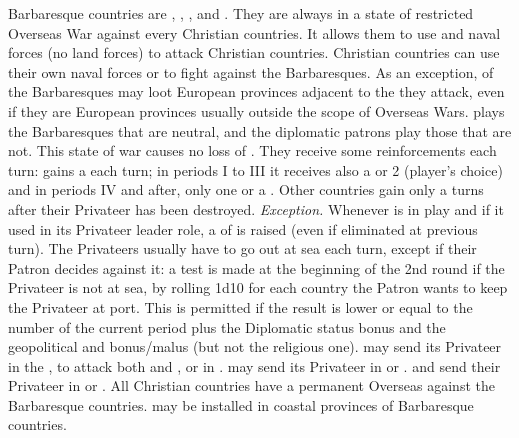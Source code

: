 \label{chSpecific:Barbaresques}
 Barbaresque countries are ,
, ,  and . They
are always in a state of restricted Overseas War against every Christian
countries.
\bparag It allows them to use \corsaire and naval forces (no land
forces) to attack Christian countries. Christian countries can use their
own naval forces or \Presidios to fight against the Barbaresques.
\bparag As an exception, \corsaire of the Barbaresques may loot European
provinces adjacent to the \STZ they attack, even if they are European
provinces usually outside the scope of Overseas Wars.
\bparag \TUR plays the Barbaresques that are neutral, and the diplomatic
patrons play those that are not.
\bparag This state of war causes no loss of \STAB.
\bparag[Reinforcements] They receive some reinforcements each turn:
 gains a \corsaire\facemoins each turn; in periods I to
III it receives also a \ND or 2 \NGD (player's choice) and in periods IV
and after, only one \NGD or a \NDE. Other countries gain only a
\corsaire{} turns after their Privateer has been destroyed.
\bparag \textit{Exception.} Whenever  is in play and if
it used in its Privateer leader role, a \corsaire\facemoins of
 is raised (even if eliminated at previous turn).
 The Privateers usually have to go out at
sea each turn, except if their Patron decides against it: a test is made
at the beginning of the 2nd round if the Privateer is not at sea, by
rolling 1d10 for each country the Patron wants to keep the Privateer at
port.  This is permitted if the result is lower or equal to the number
of the current period plus the Diplomatic status bonus and the
geopolitical and bonus/malus (but not the religious one).
\bparag {} may send its Privateer in the
, to attack both  and ,
or in .
\bparag {} may send its Privateer in  or
.
\bparag {} and  send their Privateer in
 or .
\aparag All Christian countries have a permanent Overseas \CB against
the Barbaresque countries.
\aparag \Presidios may be installed in coastal provinces of Barbaresque
countries.

